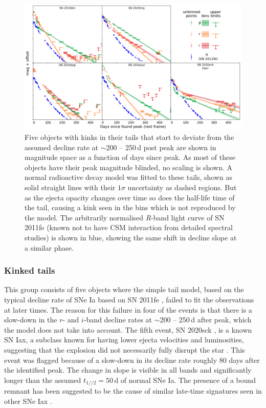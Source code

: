\documentclass[a4paper,oneside,12pt, class=Latex/Classes/PhDthesisPSnPDF, crop=false]{standalone}
\begin{document}
\begin{figure}
 \centering
 \includegraphics[width=\textwidth]{../Images/chapter_3/kinktails_plots.png}
 \caption{Five objects with kinks in their tails that start to deviate from the assumed decline rate at $\sim$200 -- 250\,d post peak are shown in magnitude space as a function of days since peak. As most of these objects have their peak magnitude blinded, no scaling is shown. A normal radioactive decay model was fitted to these tails, shown as solid straight lines with their $1\sigma$ uncertainty as dashed regions. But as the ejecta opacity changes over time so does the half-life time of the tail, causing a kink seen in the bins which is not reproduced by the model. The arbitrarily normalised \textit{R}-band light curve of SN 2011fe (known not to have CSM interaction from detailed spectral studies) \citep{spec_Lijiang-2.4m} is shown in blue, showing the same shift in decline slope at a similar phase.}
 \label{kink_plots}
\end{figure}


\subsubsection{Kinked tails}
\label{kink_tails}
This group consists of five objects where the simple tail model, based on the typical decline rate of SNe Ia based on SN 2011fe \citep{Georgios_11fe}, failed to fit the observations at later times. The reason for this failure in four of the events is that there is a slow-down in the $r$- and $i$-band decline rates at $\sim$200 -- 250\,d after peak, which the model does not take into account. The fifth event, SN 2020sck \citep{2020sck_Iax}, is a known SN Iax, a subclass known for having lower ejecta velocities and luminosities, suggesting that the explosion did not necessarily fully disrupt the star \citep{Iax_model_1, Iax_model_2}. This event was flagged because of a slow-down in its decline rate roughly 80 days after the identified peak. The change in slope is visible in all bands and significantly longer than the assumed $t_{1//2} = 50$\,d of normal SNe Ia. The presence of a bound remnant has been suggested to be the cause of similar late-time signatures seen in other SNe Iax \citep{Kawabata_iax14dt, close_Iax, Camacho-Neves_iax14dt}.
\end{document}

